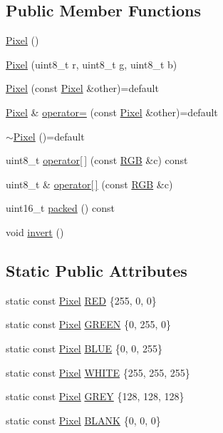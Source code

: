 \subsection*{Public Member Functions}
\begin{DoxyCompactItemize}
\item 
\hyperlink{class_pixel_a27ad99a2f705e635c42d242d530d4756}{Pixel} ()
\item 
\hyperlink{class_pixel_acfc5df218e6b318edcb09cdf6727c529}{Pixel} (uint8\+\_\+t r, uint8\+\_\+t g, uint8\+\_\+t b)
\item 
\hyperlink{class_pixel_a787fa2f52c2c61b3ad51a0ffe80b6a25}{Pixel} (const \hyperlink{class_pixel}{Pixel} \&other)=default
\item 
\hyperlink{class_pixel}{Pixel} \& \hyperlink{class_pixel_ac00753b6afb5bf23405c18f1be0ba7b8}{operator=} (const \hyperlink{class_pixel}{Pixel} \&other)=default
\item 
\hyperlink{class_pixel_a7e61f60b067f67b75eda2b31bdb7331b}{$\sim$\+Pixel} ()=default
\item 
uint8\+\_\+t \hyperlink{class_pixel_a53aaf31ca813603015645ed426c0e773}{operator\mbox{[}$\,$\mbox{]}} (const \hyperlink{class_pixel_ac2ab5194684b31a50d429b26a0569ed9}{R\+GB} \&c) const 
\item 
uint8\+\_\+t \& \hyperlink{class_pixel_aee26e313f33828aad54775818acb7f4e}{operator\mbox{[}$\,$\mbox{]}} (const \hyperlink{class_pixel_ac2ab5194684b31a50d429b26a0569ed9}{R\+GB} \&c)
\item 
uint16\+\_\+t \hyperlink{class_pixel_a3fb07455636711f0be6bcc293e244482}{packed} () const 
\item 
void \hyperlink{class_pixel_a1159eae28181f9bd41ac10833122a7d2}{invert} ()
\end{DoxyCompactItemize}
\subsection*{Static Public Attributes}
\begin{DoxyCompactItemize}
\item 
static const \hyperlink{class_pixel}{Pixel} \hyperlink{class_pixel_a0873aef3100f5b2400ee7ca185bf263a}{R\+ED} \{255, 0, 0\}
\item 
static const \hyperlink{class_pixel}{Pixel} \hyperlink{class_pixel_af1e95f87b82dedb916c81f427b3eb68a}{G\+R\+E\+EN} \{0, 255, 0\}
\item 
static const \hyperlink{class_pixel}{Pixel} \hyperlink{class_pixel_a64e919862b4e618715e6d6dba7671112}{B\+L\+UE} \{0, 0, 255\}
\item 
static const \hyperlink{class_pixel}{Pixel} \hyperlink{class_pixel_a12c08beec64c8d57bdd9ef3b49244aa3}{W\+H\+I\+TE} \{255, 255, 255\}
\item 
static const \hyperlink{class_pixel}{Pixel} \hyperlink{class_pixel_a67edde6c97818a595235295f750b50fd}{G\+R\+EY} \{128, 128, 128\}
\item 
static const \hyperlink{class_pixel}{Pixel} \hyperlink{class_pixel_a77c8aab7dad0995df6fdc8ccf65e92ee}{B\+L\+A\+NK} \{0, 0, 0\}
\end{DoxyCompactItemize}
